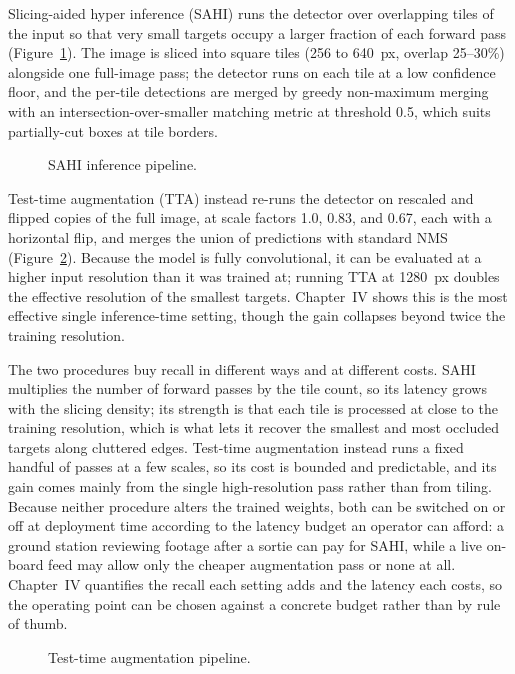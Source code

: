 Slicing-aided hyper inference (SAHI) runs the detector over overlapping tiles of
the input so that very small targets occupy a larger fraction of each forward
pass (Figure~\ref{fig:sahipipe}). The image is sliced into square tiles (256 to
640~px, overlap 25--30\%) alongside one full-image pass; the detector runs on
each tile at a low confidence floor, and the per-tile detections are merged by
greedy non-maximum merging with an intersection-over-smaller matching metric at
threshold 0.5, which suits partially-cut boxes at tile borders.

\begin{figure}[H]
  \centering
  \caption{SAHI inference pipeline.}
  \label{fig:sahipipe}
\end{figure}

Test-time augmentation (TTA) instead re-runs the detector on rescaled and
flipped copies of the full image, at scale factors 1.0, 0.83, and 0.67, each
with a horizontal flip, and merges the union of predictions with standard NMS
(Figure~\ref{fig:ttapipe}). Because the model is fully convolutional, it can be
evaluated at a higher input resolution than it was trained at; running TTA at
1280~px doubles the effective resolution of the smallest targets. Chapter~IV
shows this is the most effective single inference-time setting, though the gain
collapses beyond twice the training resolution.

The two procedures buy recall in different ways and at different costs. SAHI
multiplies the number of forward passes by the tile count, so its latency grows
with the slicing density; its strength is that each tile is processed at close
to the training resolution, which is what lets it recover the smallest and most
occluded targets along cluttered edges. Test-time augmentation instead runs a
fixed handful of passes at a few scales, so its cost is bounded and predictable,
and its gain comes mainly from the single high-resolution pass rather than from
tiling. Because neither procedure alters the trained weights, both can be
switched on or off at deployment time according to the latency budget an
operator can afford: a ground station reviewing footage after a sortie can pay
for SAHI, while a live on-board feed may allow only the cheaper augmentation
pass or none at all. Chapter~IV quantifies the recall each setting adds and the
latency each costs, so the operating point can be chosen against a concrete
budget rather than by rule of thumb.

\begin{figure}[H]
  \centering
  \caption{Test-time augmentation pipeline.}
  \label{fig:ttapipe}
\end{figure}

